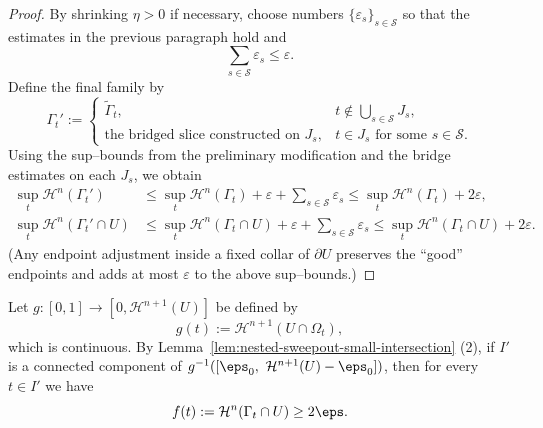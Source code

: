 \begin{lemma}
\begin{proof}
        By shrinking $\eta>0$ if necessary, choose numbers $\{\varepsilon_s\}_{s\in\mathcal S}$ so that the estimates in the previous paragraph hold and
        \begin{equation*}
          \sum_{s\in\mathcal S}\varepsilon_s \le \varepsilon.
        \end{equation*}
        Define the final family by
        \begin{equation*}
          \Gamma_t' :=
          \begin{cases}
            \widetilde{\Gamma}_t, & t\notin \displaystyle\bigcup_{s\in\mathcal S} J_s,\\[2pt]
            \text{the bridged slice constructed on }J_s, & t\in J_s \text{ for some } s\in\mathcal S.
          \end{cases}
        \end{equation*}
        Using the sup–bounds from the preliminary modification and the bridge estimates on each $J_s$, we obtain
        \begin{equation*}
            \begin{split}
                \sup_t \mathcal{H}^n(\Gamma_t')
                &\le \sup_t \mathcal{H}^n(\Gamma_t) + \varepsilon + \sum_{s\in\mathcal S}\varepsilon_s \le \sup_t \mathcal{H}^n(\Gamma_t)+2\varepsilon,\\
                \sup_t \mathcal{H}^n(\Gamma_t'\cap U)
                &\le \sup_t \mathcal{H}^n(\Gamma_t\cap U)+\varepsilon+\sum_{s\in\mathcal{S}}\varepsilon_s \le \sup_t \mathcal{H}^n(\Gamma_t\cap U)+2\varepsilon.
            \end{split}
        \end{equation*}
        (Any endpoint adjustment inside a fixed collar of $\partial U$ preserves the “good” endpoints and adds at most $\varepsilon$ to the above sup–bounds.)
    \end{proof}
\end{lemma}

Let $g:[0,1]\to[0,\mathcal{H}^{n+1}(U)]$ be defined by
\begin{equation*}
  g(t):=\mathcal{H}^{n+1}(U\cap\Omega_t),
\end{equation*}
which is continuous. %
By Lemma~\ref{lem:nested-sweepout-small-intersection} (2), if $I'$ is a connected component of
$g^{-1}([\eps_0,\ \mathcal{H}^{n+1}(U)-\eps_0])$, then for every $t\in I'$ we have
\begin{equation*}
  f(t):=\mathcal{H}^{n}(\Gamma_t\cap U) \ge 2\eps.
\end{equation*}

